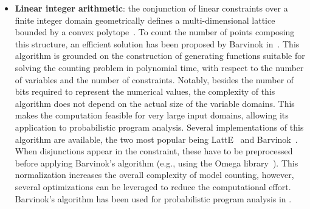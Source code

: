 \begin{itemize}
	\item \textbf{Linear integer arithmetic}: the conjunction of linear constraints over a finite integer domain geometrically defines a multi-dimensional lattice bounded by a convex polytope~\cite{de2008computationalGeometry}. To count the number of points composing this structure, an efficient solution has been proposed by Barvinok in~\cite{barvinok1994polynomial}. This algorithm is grounded on the construction of generating functions suitable for solving the counting problem in polynomial time, with respect to the number of variables and the number of constraints. Notably, besides the number of bits required to represent the numerical values, the complexity of this algorithm does not depend on the actual size of the variable domains. This makes the computation feasible for very large input domains, allowing its application to probabilistic program analysis. Several implementations of this algorithm are available, the two most popular being LattE~\cite{LattESoftware} and Barvinok~\cite{verdoolaegesoftware}. When disjunctions appear in the constraint, these have to be preprocessed before applying Barvinok's algorithm (e.g., using the Omega library~\cite{Omega1996}). This normalization increases the overall complexity of model counting, however, several optimizations can be leveraged to reduce the computational effort.
Barvinok's algorithm has been used for probabilistic program analysis in \cite{Geldenhuys2012,Filieri2013,Filieri2015}.


\end{itemize}
